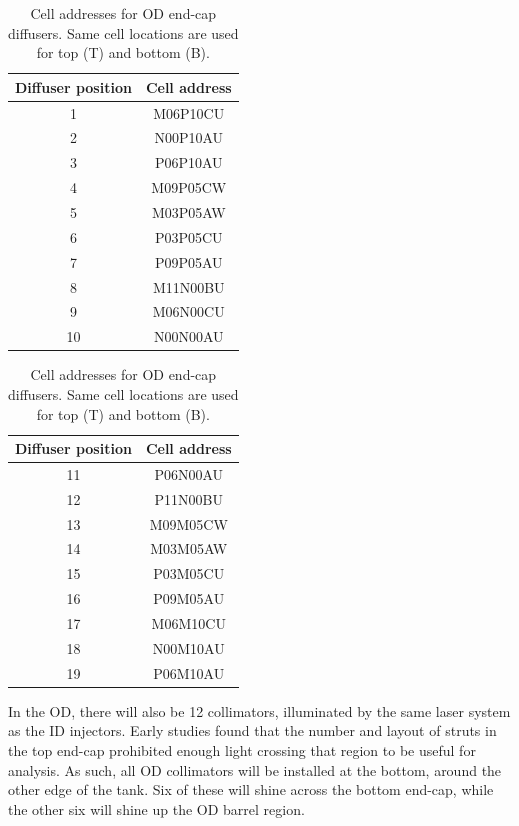 \documentclass[a4paper,11pt]{article}
\begin{document}
\begin{table}[h!]
\centering
\begin{tabular}[t]{c|c} \toprule
Diffuser position 		& Cell address  \\ \midrule
            1           &   M06P10CU    \\
            2           &   N00P10AU    \\
            3           &   P06P10AU    \\
            4           &   M09P05CW    \\
            5           &   M03P05AW    \\
            6           &   P03P05CU    \\
            7           &   P09P05AU    \\
            8           &   M11N00BU    \\
            9           &   M06N00CU    \\
            10          &   N00N00AU    \\ \bottomrule 
\end{tabular}
\hspace{1cm}
\begin{tabular}[t]{c|c} \toprule
Diffuser position 		& Cell address  \\ \midrule
            11          &   P06N00AU    \\
            12          &   P11N00BU    \\
            13          &   M09M05CW    \\
            14          &   M03M05AW    \\
            15          &   P03M05CU    \\
            16          &   P09M05AU    \\
            17          &   M06M10CU    \\
            18          &   N00M10AU    \\
            19          &   P06M10AU    \\ \bottomrule 
\end{tabular}
\caption{Cell addresses for OD end-cap diffusers. Same cell locations are used for top (T) and bottom (B).}\label{tab:ODdiffEndcap}
\end{table}

In the OD, there will also be 12 collimators, illuminated by the same laser system as the ID injectors. Early studies found that the number and layout of struts in the top end-cap prohibited enough light crossing that region to be useful for analysis. As such, all OD collimators will be installed at the bottom, around the other edge of the tank. Six of these will shine across the bottom end-cap, while the other six will shine up the OD barrel region.
\end{document}
